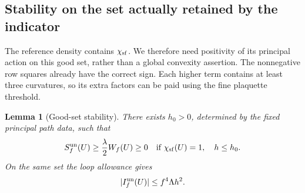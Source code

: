 \documentclass[11pt,reqno]{amsart}
\numberwithin{equation}{section}
\newtheorem{lemma}[theorem]{Lemma}
\theoremstyle{definition}
\theoremstyle{remark}
\begin{document}
\subsection{Stability on the set actually retained by the indicator}

The reference density contains \(\chi_{\rm sf}\). We therefore
need positivity of its principal action on this good set, rather
than a global convexity assertion. The nonnegative row squares
already have the correct sign. Each higher term contains at least
three curvatures, so its extra factors can be paid using the fine
plaquette threshold.

\begin{lemma}[Good-set stability]
\label{lem:tail-good-stability}
There exists \(h_0>0\), determined by the fixed principal path data,
such that
\begin{equation}
       S_f^{\rm un}(U)\ge\frac\lambda2 W_f(U)\ge0
          \quad\text{if }\chi_{\rm sf}(U)=1,\quad h\le h_0.
 \label{eq:tail-good-stability}
\end{equation}
On the same set the loop allowance gives
\begin{equation}
                         |I_f^{\rm un}(U)|\le f^4\Lambda h^2.
 \label{eq:tail-good-loop-price}
\end{equation}
\end{lemma}
\end{document}
